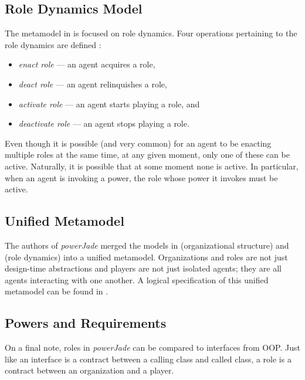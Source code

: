 \subsection*{Role Dynamics Model}

The metamodel in \cite{Dastani04} is focused on role dynamics.
Four operations pertaining to the role dynamics are defined \cite{Dastani04}:
\begin{itemize}
	\item \textit{enact role} --- an agent acquires a role,
	\item \textit{deact role} --- an agent relinquishes a role,
	\item \textit{activate role} --- an agent starts playing a role, and
	\item \textit{deactivate role} --- an agent stops playing a role.
\end{itemize}

Even though it is possible (and very common) for an agent to be enacting multiple roles at the same time, at any given moment, only one of these can be active.
Naturally, it is possible that at some moment none is active.
In particular, when an agent is invoking a power, the role whose power it invokes must be active.

\subsection*{Unified Metamodel}

The authors of \textit{powerJade} merged the models in \cite{Boella04} (organizational structure) and \cite{Boella04} (role dynamics) into a unified metamodel.
Organizations and roles are not just design-time abstractions and players are not just isolated agents; they are all agents interacting with one another.
A logical specification of this unified metamodel can be found in \cite{Boella07}.

\subsection*{Powers and Requirements}

On a final note, roles in \textit{powerJade} can be compared to interfaces from OOP.
Just like an interface is a contract between a calling class and called class, a role is a contract between an organization and a player.

